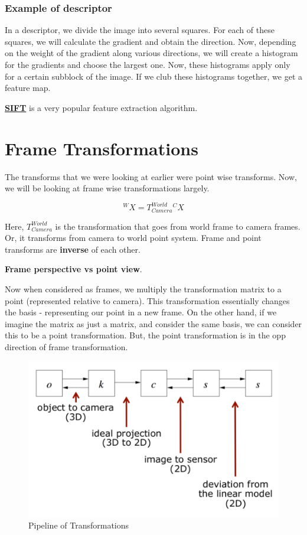 \subsubsection{Example of descriptor}

In a descriptor, we divide the image into several squares. For each of these squares, we will calculate the gradient and obtain the direction. Now, depending on the weight of the gradient along various directions, we will create a histogram for the gradients and choose the largest one. Now, these histograms apply only for a certain subblock of the image. If we club these histograms together, we get a feature map.

\href{https://medium.com/data-breach/introduction-to-sift-scale-invariant-feature-transform-65d7f3a72d40}{\textbf{SIFT}} is a very popular feature extraction algorithm.

\section{Frame Transformations}

The transforms that we were looking at earlier were point wise transforms. Now, we will be looking at frame wise transformations largely.

\begin{equation*}
    {}^WX=T^{World}_{Camera}{}^CX
\end{equation*}

Here, $T^{World}_{Camera}$ is the transformation that goes from world frame to camera frames. Or, it transforms from camera to world point system. Frame and point transforms are \textbf{inverse} of each other. 

\textbf{Frame perspective vs point view}.

Now when considered as frames, we multiply the transformation matrix to a point (represented relative to camera). This transformation essentially changes the basis - representing our point in a new frame. On the other hand, if we imagine the matrix as just a matrix, and consider the same basis, we can consider this to be a point transformation. But, the point transformation is in the opp direction of frame transformation.

\begin{figure}[h]
    \centering
    \includegraphics[width=12cm]{img/camera-pipeline.png}
    \caption{Pipeline of Transformations}
    \label{fig:pipeline}
\end{figure}

